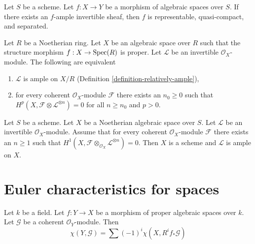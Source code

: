 \begin{lemma}
\label{lemma-relatively-ample-properties}
Let $S$ be a scheme.
Let $f : X \to Y$ be a morphism of algebraic spaces over $S$.
If there exists an $f$-ample invertible sheaf, then
$f$ is representable, quasi-compact, and separated.
\end{lemma}

\begin{lemma}
Let $R$ be a Noetherian ring. Let $X$ be an algebraic space over $R$
such that the structure morphism $f : X \to \mathop{\rm Spec}(R)$ is proper.
Let $\mathcal{L}$ be an invertible $\mathcal{O}_X$-module.
The following are equivalent
\begin{enumerate}
\item $\mathcal{L}$ is ample on $X/R$
(Definition \ref{definition-relatively-ample}),
\item for every coherent $\mathcal{O}_X$-module $\mathcal{F}$
there exists an $n_0 \geq 0$ such that
$H^p(X, \mathcal{F} \otimes \mathcal{L}^{\otimes n}) = 0$
for all $n \geq n_0$ and $p > 0$.
\end{enumerate}
\end{lemma}

\begin{lemma}
\label{lemma-Noetherian-h1-zero-invertible}
Let $S$ be a scheme. Let $X$ be a Noetherian algebraic space over $S$.
Let $\mathcal{L}$ be an invertible $\mathcal{O}_X$-module.
Assume that for every coherent $\mathcal{O}_X$-module
$\mathcal{F}$ there exists an $n \geq 1$ such that
$H^1(X, \mathcal{F} \otimes_{\mathcal{O}_X} \mathcal{L}^{\otimes n}) = 0$.
Then $X$ is a scheme and $\mathcal{L}$ is ample on $X$.
\end{lemma}

\section{Euler characteristics for spaces}
\begin{lemma}
\label{lemma-euler-characteristic-morphism}
Let $k$ be a field. Let $f : Y \to X$ be a morphism of proper algebraic spaces
over $k$. Let $\mathcal{G}$ be a coherent $\mathcal{O}_Y$-module. Then
$$
\chi(Y, \mathcal{G}) = \sum (-1)^i \chi(X, R^if_*\mathcal{G})
$$
\end{lemma}

